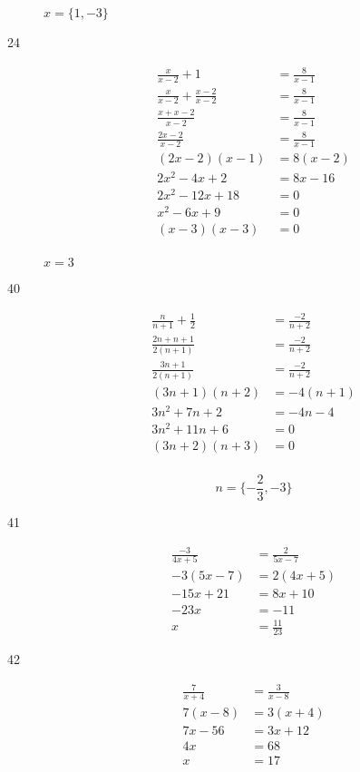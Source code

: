 \documentclass[fleqn,addpoints]{exam}
\begin{document}
\begin{description}
\( x = \{1, -3\} \)

\item[24]
\begin{align*}
  \frac{x}{x-2} + 1 &= \frac{8}{x-1} \\
  \frac{x}{x-2} + \frac{x-2}{x-2} &= \frac{8}{x-1} \\
  \frac{x + x - 2}{x-2}  &= \frac{8}{x-1} \\
  \frac{2x - 2}{x-2}  &= \frac{8}{x-1} \\
  (2x-2)(x-1) &= 8(x-2) \\
  2x^2-4x+2 &= 8x-16 \\
  2x^2-12x+18 &= 0 \\
  x^2-6x+9 &= 0 \\
  (x-3)(x-3) &= 0 \\
\end{align*}

\( x = 3 \)

\item[40]
\begin{align*}
  \frac{n}{n+1} + \frac{1}{2} &= \frac{-2}{n+2} \\
  \frac{2n + n + 1}{2(n+1)}  &= \frac{-2}{n+2} \\
  \frac{3n + 1}{2(n+1)}  &= \frac{-2}{n+2} \\
  (3n+1)(n+2) &= -4(n+1) \\
  3n^2+7n+2 &= -4n-4 \\
  3n^2+11n+6 &= 0 \\
  (3n+2)(n+3) &= 0 \\
\end{align*}

\[ n = \{ - \frac{2}{3}, -3 \} \]

\item[41]
\begin{align*}
  \frac{-3}{4x+5} &= \frac{2}{5x-7} \\
  -3(5x-7) &= 2(4x+5) \\
  -15x+21 &= 8x+10 \\
  -23x &= -11 \\
  x &= \frac{11}{23}
\end{align*}

\item[42]
\begin{align*}
  \frac{7}{x+4} &= \frac{3}{x-8} \\
  7(x-8) &= 3(x+4) \\
  7x-56 &= 3x+12 \\
  4x &= 68 \\
  x &= 17 \\
\end{align*}


\end{description}
\end{document}
